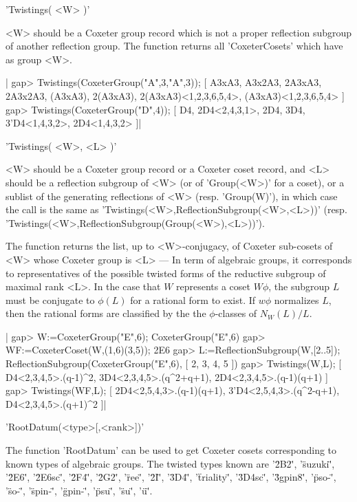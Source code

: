 'Twistings( <W> )'

<W>  should be  a Coxeter  group record  which is  not a  proper reflection
subgroup   of   another   reflection   group.   The  function  returns  all
'CoxeterCosets' which have as group <W>.

|    gap> Twistings(CoxeterGroup("A",3,"A",3));
    [ A3xA3, A3x2A3, 2A3xA3, 2A3x2A3, (A3xA3), 2(A3xA3),
      2(A3xA3)<1,2,3,6,5,4>, (A3xA3)<1,2,3,6,5,4> ]
    gap> Twistings(CoxeterGroup("D",4));
    [ D4, 2D4<2,4,3,1>, 2D4, 3D4, 3'D4<1,4,3,2>, 2D4<1,4,3,2> ]|

'Twistings( <W>, <L> )'

<W>  should be a  Coxeter group record  or a Coxeter  coset record, and <L>
should be a reflection subgroup of <W> (or of 'Group(<W>)' for a coset), or
a sublist of the generating reflections of <W> (resp. 'Group(W)'), in which
case  the call is  the same as 'Twistings(<W>,ReflectionSubgroup(<W>,<L>))'
(resp.  'Twistings(<W>,ReflectionSubgroup(Group(<W>),<L>))').

The  function returns the list, up  to <W>-conjugacy, of Coxeter sub-cosets
of  <W> whose  Coxeter group  is <L>  --- In  term of  algebraic groups, it
corresponds  to  representatives  of  the  possible  twisted  forms  of the
reductive  subgroup of maximal rank <L>. In  the case that $W$ represents a
coset  $W\phi$,  the  subgroup  $L$  must  be  conjugate to $\phi(L)$ for a
rational  form to exist. If $w\phi$ normalizes $L$, then the rational forms
are classified by the the $\phi$-classes of $N_W(L)/L$.

|    gap> W:=CoxeterGroup("E",6);
    CoxeterGroup("E",6)
    gap> WF:=CoxeterCoset(W,(1,6)(3,5));
    2E6
    gap> L:=ReflectionSubgroup(W,[2..5]);
    ReflectionSubgroup(CoxeterGroup("E",6), [ 2, 3, 4, 5 ])
    gap> Twistings(W,L);
    [ D4<2,3,4,5>.(q-1)^2, 3D4<2,3,4,5>.(q^2+q+1),
      2D4<2,3,4,5>.(q-1)(q+1) ]
    gap> Twistings(WF,L);
    [ 2D4<2,5,4,3>.(q-1)(q+1), 3'D4<2,5,4,3>.(q^2-q+1),
      D4<2,3,4,5>.(q+1)^2 ]|


'RootDatum(<type>[,<rank>])'

The function 'RootDatum' can be used to get Coxeter cosets corresponding to
known  types of  algebraic groups.  The twisted  types known are '\"2B2\"',
'\"suzuki\"',  '\"2E6\"',  '\"2E6sc\"',  '\"2F4\"',  '\"2G2\"',  '\"ree\"',
'\"2I\"', '\"3D4\"', '\"triality\"', '\"3D4sc\"', '\"3gpin8\"', '\"pso-\"',
'\"so-\"', '\"spin-\"', '\"gpin-\"', '\"psu\"', '\"su\"', '\"u\"'.

